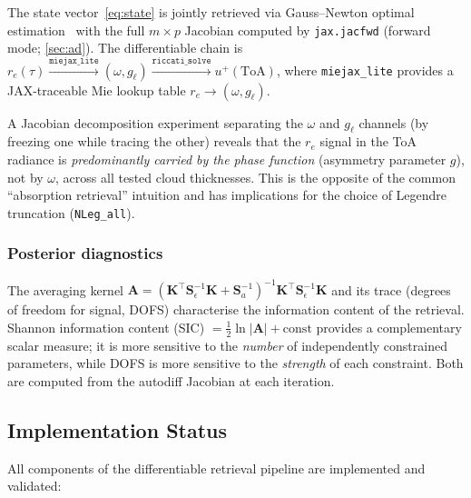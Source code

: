 \documentclass[11pt,a4paper]{article}
\newcommand{\mat}[1]{\mathbf{#1}}
\theoremstyle{definition}
\begin{document}
The state vector~\eqref{eq:state} is jointly retrieved via
Gauss--Newton optimal estimation~\cite{rodgers2000} with the full
$m \times p$ Jacobian computed by \texttt{jax.jacfwd} (forward mode;
\cref{sec:ad}).  The differentiable chain is
$r_e(\tau) \xrightarrow{\texttt{miejax\_lite}} (\omega, g_\ell)
\xrightarrow{\texttt{riccati\_solve}} u^+(\mathrm{ToA})$, where
\texttt{miejax\_lite} provides a JAX-traceable Mie lookup table
$r_e \to (\omega, g_\ell)$.

A Jacobian decomposition experiment separating the $\omega$ and $g_\ell$
channels (by freezing one while tracing the other) reveals that the
$r_e$ signal in the ToA radiance is \emph{predominantly carried by the
phase function} (asymmetry parameter $g$), not by $\omega$, across all
tested cloud thicknesses.  This is the opposite of the common
``absorption retrieval'' intuition and has implications for the choice of
Legendre truncation (\texttt{NLeg\_all}).

\subsubsection{Posterior diagnostics}

The averaging kernel $\mat{A} = (\mat{K}^\top \mat{S}_\epsilon^{-1}
\mat{K} + \mat{S}_a^{-1})^{-1} \mat{K}^\top \mat{S}_\epsilon^{-1}
\mat{K}$ and its trace (degrees of freedom for signal, DOFS) characterise
the information content of the retrieval.  Shannon information content
(SIC) $= \tfrac{1}{2}\ln|\mat{A}| + \mathrm{const}$ provides a
complementary scalar measure; it is more sensitive to the \emph{number}
of independently constrained parameters, while DOFS is more sensitive
to the \emph{strength} of each constraint.  Both are computed from the
autodiff Jacobian at each iteration.

\subsection{Implementation Status}\label{sec:status}

All components of the differentiable retrieval pipeline are implemented
and validated:
\end{document}
